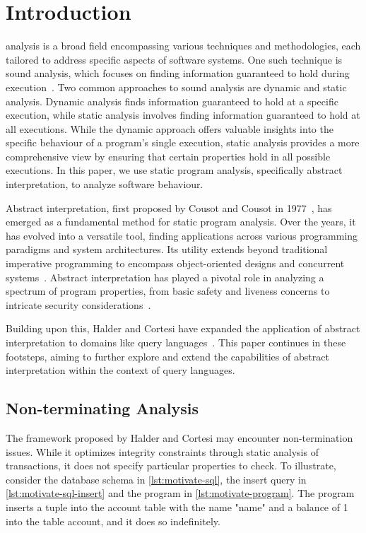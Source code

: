 \section{Introduction}\label{sec:introduction}
 analysis is a broad field encompassing various techniques and methodologies, each tailored to address specific aspects of software systems.
One such technique is sound analysis, which focuses on finding information guaranteed to hold during execution~\cite{jackson_software_2000}.
Two common approaches to sound analysis are dynamic and static analysis.
Dynamic analysis finds information guaranteed to hold at a specific execution, while static analysis involves finding information guaranteed to hold at all executions.
While the dynamic approach offers valuable insights into the specific behaviour of a program's single execution, static analysis provides a more comprehensive view by ensuring that certain properties hold in all possible executions.
In this paper, we use static program analysis, specifically abstract interpretation, to analyze software behaviour.

Abstract interpretation, first proposed by Cousot and Cousot in 1977~\cite{cousot_abstract_1977}, has emerged as a fundamental method for static program analysis.
Over the years, it has evolved into a versatile tool, finding applications across various programming paradigms and system architectures.
Its utility extends beyond traditional imperative programming to encompass object-oriented designs and concurrent systems~\cite{gustafsson_analyzing_2013, mine_static_2023}.
Abstract interpretation has played a pivotal role in analyzing a spectrum of program properties, from basic safety and liveness concerns to intricate security considerations~\cite{mastroeni_abstract_2011}.

Building upon this, Halder and Cortesi have expanded the application of abstract interpretation to domains like query languages~\cite{halder_abstract_2012}.
This paper continues in these footsteps, aiming to further explore and extend the capabilities of abstract interpretation within the context of query languages.


\subsection{Non-terminating Analysis}\label{subsec:non-terminating-analysis}
The framework proposed by Halder and Cortesi may encounter non-termination issues.
While it optimizes integrity constraints through static analysis of transactions, it does not specify particular properties to check.
To illustrate, consider the database schema in \autoref{lst:motivate-sql}, the insert query in \autoref{lst:motivate-sql-insert} and the program in \autoref{lst:motivate-program}.
The program inserts a tuple into the account table with the name "name" and a balance of 1 into the table account, and it does so indefinitely.

